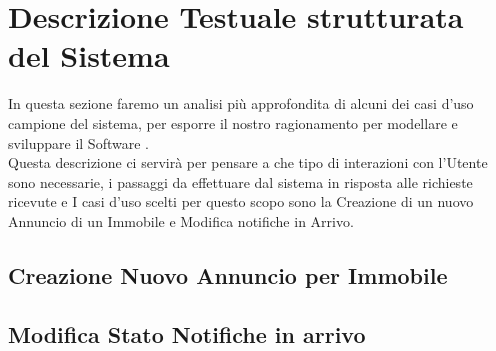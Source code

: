 \section{Descrizione Testuale strutturata del Sistema}
In questa sezione faremo un analisi più approfondita di alcuni dei casi d'uso campione del sistema, per esporre il nostro ragionamento per modellare e sviluppare il Software .\\
Questa descrizione ci servirà per pensare a che tipo di interazioni con l'Utente sono necessarie, i passaggi da effettuare  dal sistema in risposta alle richieste ricevute e 
I casi d'uso scelti per questo scopo sono la Creazione di un nuovo Annuncio di un Immobile e Modifica notifiche in Arrivo.
  
    \subsection*{Creazione Nuovo Annuncio per Immobile}

\newpage
\subsection*{Modifica Stato Notifiche in arrivo}
